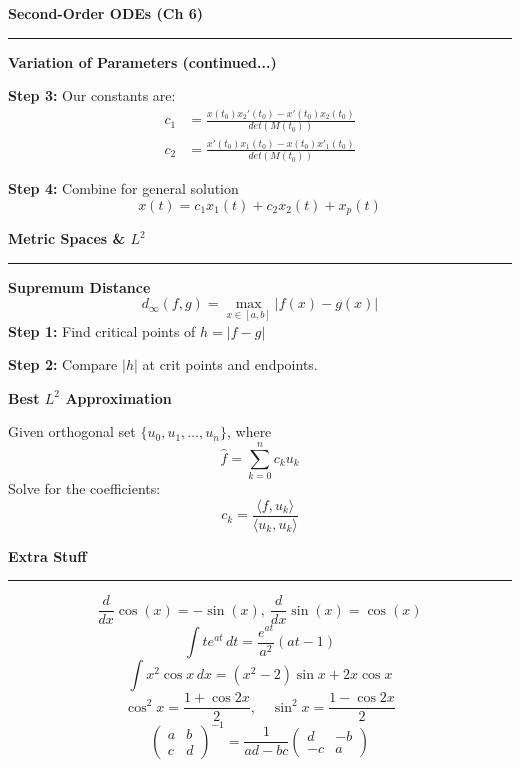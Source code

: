\documentclass[12pt]{article}
\newcommand{\mat}[1]{\begin{pmatrix}#1\end{pmatrix}}
\newcommand{\heading}[1]{%
  \vspace{10pt}
  \textbf{#1} \\[-12pt]
  \rule{\linewidth}{0.4pt}
  \par\vspace{2pt}
}
\newcommand{\sub}[1]{\smallskip\textbf{#1}\;}
\newlength{\colw}
\begin{document}
\hfill\vrule\hfill
\begin{minipage}[t]{\colw}

    \heading{Second-Order ODEs (Ch 6)}

    \sub{Variation of Parameters (continued...)}

    \textbf{Step 3:} Our constants are:
    \begin{align*}
        c_1 & = \frac{x(t_0)x_2'(t_0) - x'(t_0)x_2(t_0)}{det(M(t_0))} \\
        c_2 & = \frac{x'(t_0)x_1(t_0) - x(t_0)x'_1(t_0)}{det(M(t_0))}
    \end{align*}

    \textbf{Step 4:} Combine for general solution
    \begin{equation*}
        x(t) = c_1 x_1(t) + c_2 x_2(t) + x_p(t)
    \end{equation*}

    \heading{Metric Spaces \& $L^2$}

    \sub{Supremum Distance}
    \[ d_{\infty}(f,g) = \max_{x \in [a,b]} |f(x) - g(x)| \]
    \textbf{Step 1:} Find critical points of $h = |f-g|$

    \textbf{Step 2:} Compare $|h|$ at crit points and endpoints.

    \sub{Best $L^2$ Approximation}

    Given orthogonal set $\{u_0, u_1, \dots, u_n\}$, where
    \[ \hat{f} = \sum_{k=0}^n c_k u_k \]
    Solve for the coefficients:
    \[ c_k = \frac{\langle f, u_k \rangle}{\langle u_k, u_k \rangle} \]

    \heading{Extra Stuff}
    \[ \frac{d}{dx} \cos(x) = -\sin(x), ~ \frac{d}{dx} \sin(x) = \cos(x)\]
    \[ \int t e^{at} \, dt = \frac{e^{at}}{a^2}(at - 1) \]
    \[ \int x^2 \cos x \, dx = (x^2 - 2)\sin x + 2x \cos x \]
    \[ \cos^2 x = \frac{1 + \cos 2x}{2}, \quad \sin^2 x = \frac{1 - \cos 2x}{2} \]
    \[ \mat{a & b \\ c & d}^{-1} = \frac{1}{ad-bc} \mat{d & -b \\ -c & a} \]
\end{minipage}
\end{document}
